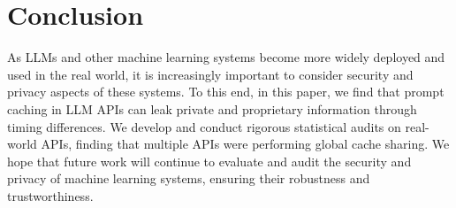 \section{Conclusion}

As LLMs and other machine learning systems become more widely deployed and used in the real world, it is increasingly important to consider security and privacy aspects of these systems. To this end, in this paper, we find that prompt caching in LLM APIs can leak private and proprietary information through timing differences. We develop and conduct rigorous statistical audits on real-world APIs, finding that multiple APIs were performing global cache sharing. We hope that future work will continue to evaluate and audit the security and privacy of machine learning systems, ensuring their robustness and trustworthiness.

